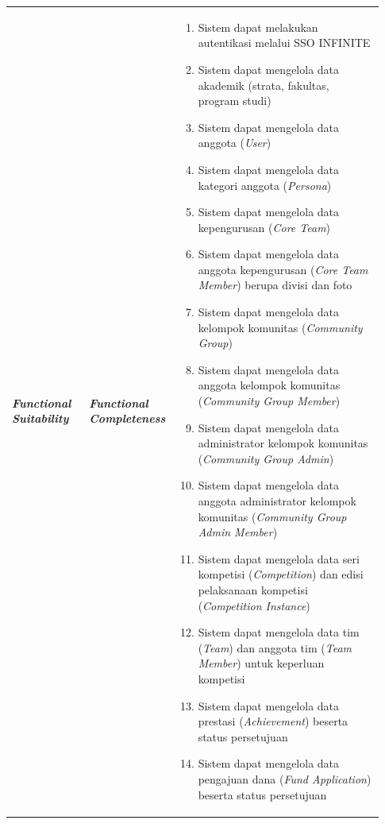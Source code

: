 \begin{longtable}{|p{0.2\linewidth}|p{0.2\linewidth}|p{0.53\linewidth}|}
      \textbf{\textit{Functional Suitability}}                    & \textbf{\textit{Functional Completeness}}                                                                                                               & \begin{enumerate}[before=\vspace{-8pt}, leftmargin=*, nosep, series=FSCM] \item Sistem dapat melakukan autentikasi melalui SSO INFINITE \item Sistem dapat mengelola data akademik (strata, fakultas, program studi) \item Sistem dapat mengelola data anggota (\textit{User}) \item Sistem dapat mengelola data kategori anggota (\textit{Persona}) \item Sistem dapat mengelola data kepengurusan (\textit{Core Team}) \item Sistem dapat mengelola data anggota kepengurusan (\textit{Core Team Member}) berupa divisi dan foto \item Sistem dapat mengelola data kelompok komunitas (\textit{Community Group}) \item Sistem dapat mengelola data anggota kelompok komunitas (\textit{Community Group Member}) \item Sistem dapat mengelola data administrator kelompok komunitas (\textit{Community Group Admin}) \item Sistem dapat mengelola data anggota administrator kelompok komunitas (\textit{Community Group Admin Member}) \item Sistem dapat mengelola data seri kompetisi (\textit{Competition}) dan edisi pelaksanaan kompetisi (\textit{Competition Instance}) \item Sistem dapat mengelola data tim (\textit{Team}) dan anggota tim (\textit{Team Member}) untuk keperluan kompetisi \item Sistem dapat mengelola data prestasi (\textit{Achievement}) beserta status persetujuan \item Sistem dapat mengelola data pengajuan dana (\textit{Fund Application}) beserta status persetujuan \end{enumerate} \\

\end{longtable}
